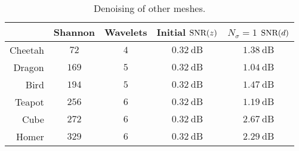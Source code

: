 \begin{table}
	\centering
	\caption[
		Denoising of other meshes
	]{
		Denoising of other meshes.
	}\label{tab:chapter5_denoising}
	\begin{tabular}{@{}rcccc@{}}
		\toprule
		        & Shannon       & Wavelets    & Initial \(\text{SNR}(z)\)        & \(N_{\sigma}=1\) \(\text{SNR}(d)\) \\
		\midrule
		Cheetah & \(\num{72}\)  & \(\num{4}\) & \(\SI{0.32}{\dB}\) & \(\SI{1.38}{\dB}\) \\
		Dragon  & \(\num{169}\) & \(\num{5}\) & \(\SI{0.32}{\dB}\) & \(\SI{1.04}{\dB}\) \\
		Bird    & \(\num{194}\) & \(\num{5}\) & \(\SI{0.32}{\dB}\) & \(\SI{1.47}{\dB}\) \\
		Teapot  & \(\num{256}\) & \(\num{6}\) & \(\SI{0.32}{\dB}\) & \(\SI{1.19}{\dB}\) \\
		Cube    & \(\num{272}\) & \(\num{6}\) & \(\SI{0.32}{\dB}\) & \(\SI{2.67}{\dB}\) \\
		Homer   & \(\num{329}\) & \(\num{6}\) & \(\SI{0.32}{\dB}\) & \(\SI{2.29}{\dB}\) \\
		\bottomrule
	\end{tabular}
\end{table}
